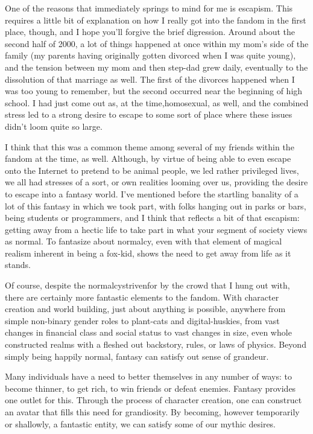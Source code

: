 One of the reasons that immediately springs to mind for me is escapism. This requires a little bit of explanation on how I really got into the fandom in the first place, though, and I hope you'll forgive the brief digression. Around about the second half of 2000, a lot of things happened at once within my mom's side of the family (my parents having originally gotten divorced when I was quite young), and the tension between my mom and then step-dad grew daily, eventually to the dissolution of that marriage as well. The first of the divorces happened when I was too young to remember, but the second occurred near the beginning of high school. I had just come out as, at the time,homosexual, as well, and the combined stress led to a strong desire to escape to some sort of place where these issues didn't loom quite so large.

I think that this was a common theme among several of my friends within the fandom at the time, as well. Although, by virtue of being able to even escape onto the Internet to pretend to be animal people, we led rather privileged lives, we all had stresses of a sort, or own realities looming over us, providing the desire to escape into a fantasy world. I've mentioned before the startling banality of a lot of this fantasy in which we took part, with folks hanging out in parks or bars, being students or programmers, and I think that reflects a bit of that escapism: getting away from a hectic life to take part in what your segment of society views as normal. To fantasize about normalcy, even with that element of magical realism inherent in being a fox-kid, shows the need to get away from life as it stands.

Of course, despite the normalcystrivenfor by the crowd that I hung out with, there are certainly more fantastic elements to the fandom. With character creation and world building, just about anything is possible, anywhere from simple non-binary gender roles to plant-cats and digital-huskies, from vast changes in financial class and social status to vast changes in size, even whole constructed realms with a fleshed out backstory, rules, or laws of physics. Beyond simply being happily normal, fantasy can satisfy out sense of grandeur.

Many individuals have a need to better themselves in any number of ways: to become thinner, to get rich, to win friends or defeat enemies. Fantasy provides one outlet for this. Through the process of character creation, one can construct an avatar that fills this need for grandiosity. By becoming, however temporarily or shallowly, a fantastic entity, we can satisfy some of our mythic desires.

